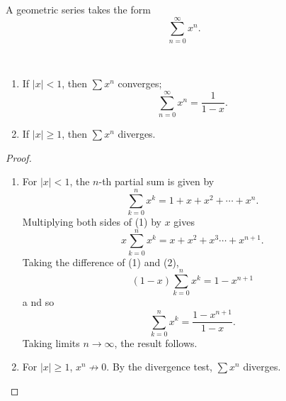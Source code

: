 \begin{example}
A geometric series takes the form
\[\sum_{n=0}^{\infty}x^n.\]

\begin{proposition*} \
\begin{enumerate}[label=(\roman*)]
\item If $|x|<1$, then $\sum x^n$ converges;
\[\sum_{n=0}^{\infty}x^n=\frac{1}{1-x}.\]
\item If $|x|\ge1$, then $\sum x^n$ diverges.
\end{enumerate}
\end{proposition*}

\begin{proof} \
\begin{enumerate}[label=(\roman*)]
\item For $|x|<1$, the $n$-th partial sum is given by
\begin{equation*}\tag{1}
\sum_{k=0}^{n}x^k=1+x+x^2+\cdots+x^n.
\end{equation*}
Multiplying both sides of (1) by $x$ gives
\begin{equation*}\tag{2}
x\sum_{k=0}^{n}x^k=x+x^2+x^3\cdots+x^{n+1}.
\end{equation*}
Taking the difference of (1) and (2),
\[(1-x)\sum_{k=0}^{n}x^k=1-x^{n+1}\]a
nd so
\[\sum_{k=0}^{n}x^k=\frac{1-x^{n+1}}{1-x}.\]
Taking limits $n\to\infty$, the result follows.

\item For $|x|\ge 1$, $x^n\not\to 0$. By the divergence test, $\sum x^n$ diverges.
\end{enumerate}
\end{proof}
\end{example}

